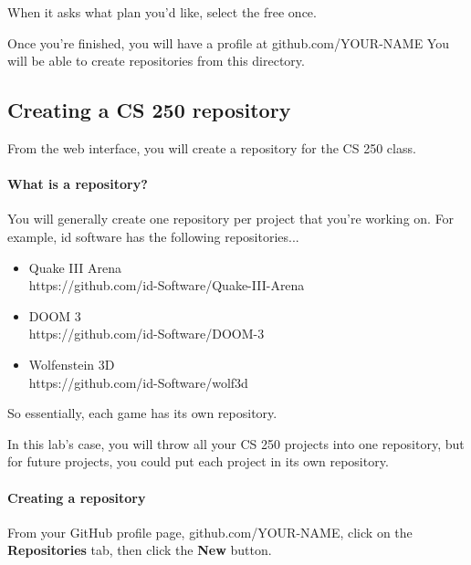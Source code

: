 \documentclass[a4paper,12pt,oneside]{book}
\begin{document}
            When it asks what plan you'd like, select the free once.

            Once you're finished, you will have a profile at
            github.com/YOUR-NAME You will be able to create repositories
            from this directory.

        \subsection{Creating a CS 250 repository}

            From the web interface, you will create a repository for
            the CS 250 class.

            \paragraph{What is a repository?}

                You will generally create one repository per project
                that you're working on. For example, id software has
                the following repositories...

                \begin{itemize}
                    \item   Quake III Arena \\ https://github.com/id-Software/Quake-III-Arena
                    \item   DOOM 3 \\ https://github.com/id-Software/DOOM-3
                    \item   Wolfenstein 3D \\ https://github.com/id-Software/wolf3d
                \end{itemize}

                So essentially, each game has its own repository.

                In this lab's case, you will throw all your CS 250 projects
                into one repository, but for future projects, you could
                put each project in its own repository.

            \paragraph{Creating a repository}

                From your GitHub profile page, github.com/YOUR-NAME,
                click on the \textbf{Repositories} tab, then click the
                \textbf{New} button.
\end{document}
